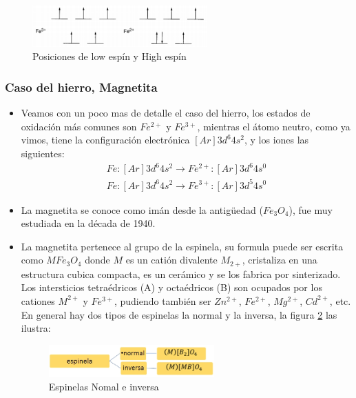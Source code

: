 \begin{figure}[H]
    \centering
    \includegraphics[width=0.6\textwidth]{./Figures/Fe3Fe2}
	\caption{Posiciones de low espín y High espín}
	\label{fig:Fe3Fe2}
\end{figure}

\subsubsection{Caso del hierro, Magnetita}

\begin{itemize}
	\item Veamos con un poco mas de detalle el caso del hierro, los estados de oxidación más comunes son $Fe^{2+}$ y $Fe^{3+}$, mientras el átomo neutro, como ya vimos, tiene la configuración electrónica $[Ar]3d^{6}4s^{2}$, y los iones las siguientes:
	\begin{equation}
	\begin{aligned}
		Fe: [Ar]3d^{6}4s^{2}\rightarrow Fe^{2+}: [Ar]3d^{6}4s^{0}  \\
		Fe: [Ar]3d^{6}4s^{2}\rightarrow Fe^{3+}: [Ar]3d^{5}4s^{0}
	\end{aligned}
	\end{equation}
	
	\item La magnetita se conoce como imán desde la antigüedad ($Fe_{3}O_{4}$), fue muy estudiada en la década de 1940.
	
	\item La magnetita pertenece al grupo de la espinela, su formula puede ser escrita como $MFe_{3}O_{4}$ donde $M$ es un catión divalente $M_{2+}$, cristaliza en una estructura cubica compacta, es un cerámico y se los fabrica por sinterizado. Los intersticios tetraédricos (A) y octaédricos (B) son ocupados por los cationes $M^{2+}$ y $Fe^{3+}$, pudiendo también ser $Zn^{2+}$, $Fe^{2+}$, $Mg^{2+}$, $Cd^{2+}$, etc. En general hay dos tipos de espinelas la normal y la inversa, la figura \ref{fig:espinela} las ilustra:
	
\begin{figure}[H]
    \centering
    \includegraphics[width=0.6\textwidth]{./Figures/espinela}
	\caption{Espinelas Nomal e inversa}
	\label{fig:espinela}
\end{figure}


\end{itemize}
